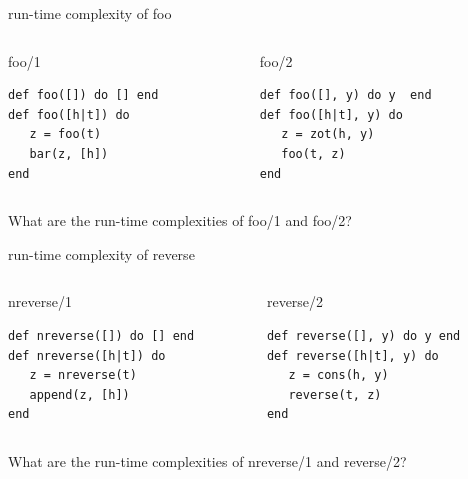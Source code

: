 \begin{frame}[fragile]{run-time complexity of foo}


\pause\vspace{20pt}
\begin{columns}
   \begin{column}{.5\linewidth}
     \begin{block}{foo/1}
       \begin{verbatim}
def foo([]) do [] end
def foo([h|t]) do
   z = foo(t)
   bar(z, [h])
end
       \end{verbatim}
      \end{block}
    \end{column}
\pause
    \begin{column}{.5\linewidth}
     \begin{block}{foo/2}
       \begin{verbatim}
def foo([], y) do y  end
def foo([h|t], y) do
   z = zot(h, y)
   foo(t, z)
end
       \end{verbatim}
      \end{block}
    \end{column}
  \end{columns}

\pause\vspace{20pt}
What are the run-time complexities of foo/1 and foo/2?

\end{frame}


\begin{frame}[fragile]{run-time complexity of reverse}

\pause\vspace{20pt}
\begin{columns}
   \begin{column}{.5\linewidth}
     \begin{block}{nreverse/1}
       \begin{verbatim}
def nreverse([]) do [] end
def nreverse([h|t]) do 
   z = nreverse(t)
   append(z, [h])
end
       \end{verbatim}
      \end{block}
    \end{column}
\pause
    \begin{column}{.5\linewidth}
     \begin{block}{reverse/2}
       \begin{verbatim}
def reverse([], y) do y end
def reverse([h|t], y) do 
   z = cons(h, y)
   reverse(t, z)
end
       \end{verbatim}
      \end{block}
    \end{column}
  \end{columns}

\pause\vspace{20pt}
What are the run-time complexities of nreverse/1 and reverse/2?

\end{frame}

